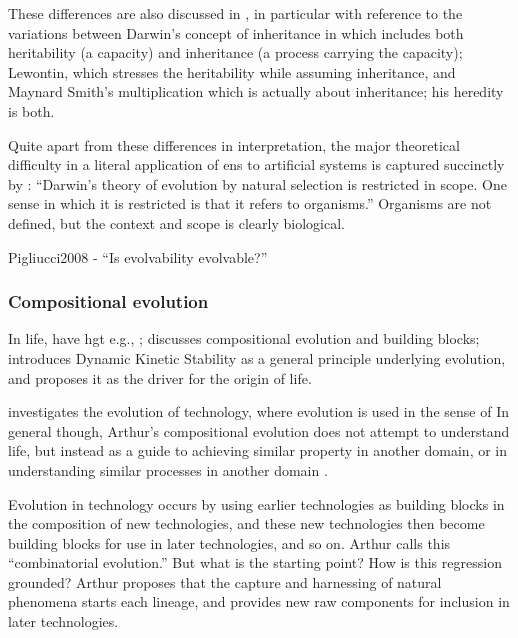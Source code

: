 These differences are also discussed in \parencite{Griesemer2001}, in particular with reference to the variations between Darwin's concept of inheritance in \cite{Darwin1859} which includes both heritability (a capacity) and inheritance (a process carrying the capacity); Lewontin, which stresses the heritability while assuming inheritance, and Maynard Smith's multiplication which is actually about inheritance; his heredity is both. \parencite{Griesemer2001}

Quite apart from these differences in interpretation, the major theoretical difficulty in a literal application of \gls{ens} to artificial systems is captured succinctly by \parencite{Griesemer2005}: ``Darwin's theory of evolution by natural selection is restricted in scope. One sense in which it is restricted is that it refers to organisms.'' Organisms are not defined, but the context and scope is clearly biological.

Pigliucci2008 - ``Is evolvability evolvable?''

\subsubsection{Compositional evolution}

In life, have \gls{hgt} e.g., \parencite{Ochman2000}; \parencite{Watson2002} discusses compositional evolution and building blocks; \parencite{Pross2011} introduces Dynamic Kinetic Stability as a general principle underlying evolution, and proposes it as the driver for the origin of life.

\parencite{Arthur2009} investigates the evolution of technology, where evolution is used in the sense of  In general though, Arthur's compositional evolution does not attempt to understand life, but instead as a guide to achieving similar property in another domain, or in understanding similar processes in another domain \parencite{Arthur2009}.

Evolution in technology occurs by using earlier technologies as building blocks in the composition of new technologies, and these new technologies then become building blocks for use in later
technologies, and so on. Arthur calls this ``combinatorial evolution.'' But what is the starting point? How is this regression grounded? Arthur proposes that the capture and harnessing of natural
phenomena starts each lineage, and provides new raw components for inclusion in later technologies.


